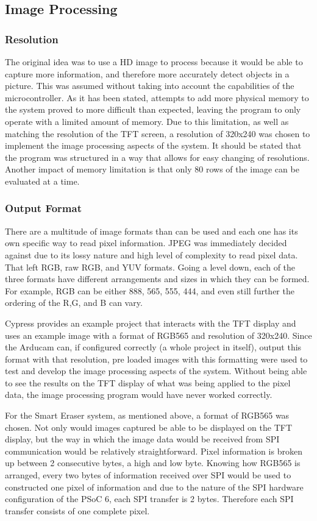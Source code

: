 \subsection{Image Processing}
\subsubsection{Resolution}
The original idea was to use a HD image to process because it would be able to capture more information, and therefore more accurately detect objects in a picture. This was assumed without taking into account the capabilities of the microcontroller. As it has been stated, attempts to add more physical memory to the system proved to more difficult than expected, leaving the program to only operate with a limited amount of memory. Due to this limitation, as well as matching the resolution of the TFT screen, a resolution of 320x240 was chosen to implement the image processing aspects of the system. It should be stated that the program was structured in a way that allows for easy changing of resolutions. Another impact of memory limitation is that only 80 rows of the image can be evaluated at a time.\\

\subsubsection{Output Format}
 There are a multitude of image formats than can be used and each one has its own specific way to read pixel information. JPEG was immediately decided against due to its lossy nature and high level of complexity to read pixel data. That left RGB, raw RGB, and YUV formats. Going a level down, each of the three formats have different arrangements and sizes in which they can be formed. For example, RGB can be either 888, 565, 555, 444, and even still further the ordering of the R,G, and B can vary.\par
\setlength{\parindent}{2.5ex} 
Cypress provides an example project that interacts with the TFT display and uses an example image with a format of RGB565 and resolution of 320x240. Since the Arducam can, if configured correctly (a whole project in itself), output this format with that resolution, pre loaded images with this formatting were used to test and develop the image processing aspects of the system. Without being able to see the results on the TFT display of what was being applied to the pixel data, the image processing program would have never worked correctly.\par
\setlength{\parindent}{2.5ex}
For the Smart Eraser system, as mentioned above, a format of RGB565 was chosen. Not only would images captured be able to be displayed on the TFT display, but the way in which the image data would be received from SPI communication would be relatively straightforward. Pixel information is broken up between 2 consecutive bytes, a high and low byte. Knowing how RGB565 is arranged, every two bytes of information received over SPI would be used to constructed one pixel of information and due to the nature of the SPI hardware configuration of the PSoC 6, each SPI transfer is 2 bytes. Therefore each SPI transfer consists of one complete pixel.

